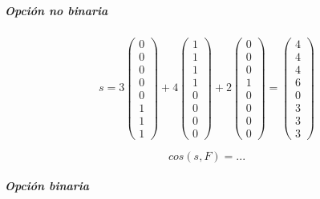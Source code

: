 \begin{problem}[?]
\subparagraph*{Opción no binaria}
\[
s = 3 \begin{pmatrix}0\\0\\0\\0\\0\\1\\1\\1\end{pmatrix} +
4 \begin{pmatrix}1\\1\\1\\1\\0\\0\\0\\0\end{pmatrix}+
2 \begin{pmatrix}0\\0\\0\\1\\0\\0\\0\\0\end{pmatrix} =
\begin{pmatrix}4\\4\\4\\6\\0\\3\\3\\3\end{pmatrix}
\]

\[
cos(s,F) = ...
\]

\subparagraph*{Opción binaria}


\end{problem}
